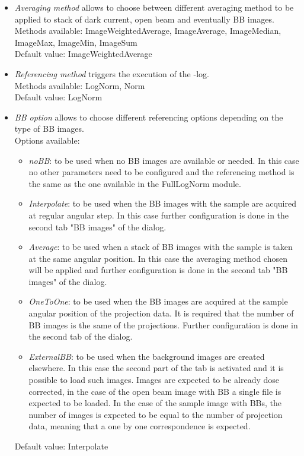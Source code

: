 \documentclass[a4paper]{scrreprt}
\begin{document}
\begin{itemize}
\item \textit{Averaging method} allows to choose between different averaging method to be applied to stack of dark current, open beam and eventually BB images.  \\ Methods available: ImageWeightedAverage, ImageAverage, ImageMedian, ImageMax, ImageMin, ImageSum \\ Default value: ImageWeightedAverage
\item \textit{Referencing method} triggers the execution of the -log. \\ Methods available: LogNorm, Norm\\ Default value: LogNorm
\item \textit{BB option} allows to choose different referencing options depending on the type of BB images. 
\\ Options available: 
\begin{itemize}
\item \textit{noBB}: to be used when no BB images are available or needed. In this case no other parameters need to be configured and the referencing method is the same as the one available in the FullLogNorm module. 
\item \textit{Interpolate}: to be used when the BB images with the sample are acquired at regular angular step. In this case further configuration is done in the second tab "BB images" of the dialog.
\item \textit{Average}: to be used when a stack of BB images with the sample is taken at the same angular position. In this case the averaging method chosen will be applied and further configuration is done in the second tab "BB images" of the dialog. 
\item \textit{OneToOne}: to be used when the BB images are acquired at the sample angular position of the projection data. It is required that the number of BB images is the same of the projections. Further configuration is done in the second tab of the dialog. 
\item \textit{ExternalBB}: to be used when the background images are created elsewhere. In this case the second part of the tab is activated and it is possible to load such images. Images are expected to be already dose corrected, in the case of the open beam image with BB a single file is expected to be loaded. In the case of the sample image with BBs, the number of images is expected to be equal to the number of projection data, meaning that a one by one correspondence is expected.
\end{itemize}
Default value: Interpolate
\end{itemize}
\end{document}
